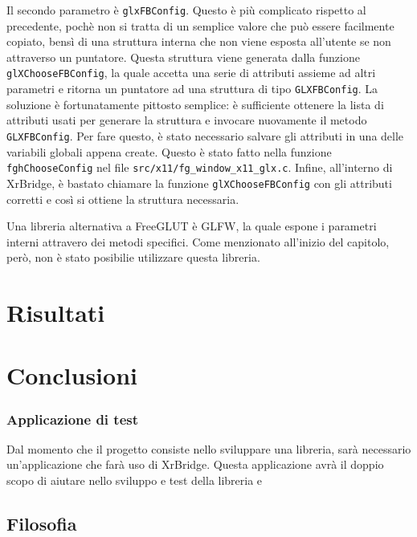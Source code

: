 \documentclass[twoside]{supsistudent}
\begin{document}
Il secondo parametro è \texttt{glxFBConfig}. Questo è più complicato rispetto al precedente, pochè non si tratta di un semplice valore che può essere facilmente copiato, bensì di una struttura interna che non viene esposta all'utente se non attraverso un puntatore. Questa struttura viene generata dalla funzione \texttt{glXChooseFBConfig}, la quale accetta una serie di attributi assieme ad altri parametri e ritorna un puntatore ad una struttura di tipo \texttt{GLXFBConfig}. La soluzione è fortunatamente pittosto semplice: è sufficiente ottenere la lista di attributi usati per generare la struttura e invocare nuovamente il metodo \texttt{GLXFBConfig}. Per fare questo, è stato necessario salvare gli attributi in una delle variabili globali appena create. Questo è stato fatto nella funzione \texttt{fghChooseConfig} nel file \texttt{src/x11/fg\_window\_x11\_glx.c}. Infine, all'interno di XrBridge, è bastato chiamare la funzione \texttt{glXChooseFBConfig} con gli attributi corretti e così si ottiene la struttura necessaria.

Una libreria alternativa a FreeGLUT è GLFW, la quale espone i parametri interni attravero dei metodi specifici. Come menzionato all'inizio del capitolo, però, non è stato posibilie utilizzare questa libreria.

\chapter{Risultati}

\chapter{Conclusioni}

\subsection{Applicazione di test}

Dal momento che il progetto consiste nello sviluppare una libreria, sarà necessario un'applicazione che farà uso di XrBridge. Questa applicazione avrà il doppio scopo di aiutare nello sviluppo e test della libreria e

\section{Filosofia}

\end{document}
